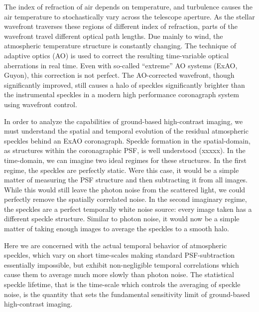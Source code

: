 \documentclass[11pt,preprint]{aastex}
\begin{document}
The index of refraction of air depends on temperature, and turbulence causes the air temperature to stochastically vary across the telescope aperture.  As the stellar wavefront traverses these regions of different index of refraction, parts of the wavefront travel different optical path lengths.  Due mainly to wind, the atmospheric temperature structure is constantly changing.  The technique of adaptive optics (AO) is used to correct the resulting time-variable optical aberrations in real time.  Even with so-called ``extreme'' AO systems (ExAO, Guyon), this correction is not perfect.  The AO-corrected wavefront, though significantly improved, still causes a halo of speckles significantly brighter than the instrumental speckles in a modern high performance coronagraph system using wavefront control.

In order to analyze the capabilities of ground-based high-contrast imaging, we must understand the spatial and temporal evolution of the residual atmospheric speckles behind an ExAO coronagraph.  Speckle formation in the spatial-domain, as structures within the coronagraphic PSF, is well understood (xxxxx).  In the time-domain, we can imagine two ideal regimes for these structures.  In the first regime, the speckles are perfectly static.  Were this case, it would be a simple matter of measuring the PSF structure and then subtracting it from all images.  While this would still leave the photon noise from the scattered light, we could perfectly remove the spatially correlated noise.  In the second imaginary regime, the speckles are a perfect temporally white noise source: every image taken has a different speckle structure.  Similar to photon noise, it would now be a simple matter of taking enough images to average the speckles to a smooth halo.

Here we are concerned with the actual temporal behavior of atmospheric speckles, which vary on short time-scales making standard PSF-subtraction essentially impossible, but exhibit non-negligible temporal correlations which cause them to average much more slowly than photon noise.  The statistical speckle lifetime, that is the time-scale which controls the averaging of speckle noise, is the quantity that sets the fundamental sensitivity limit of ground-based high-contrast imaging.
\end{document}
